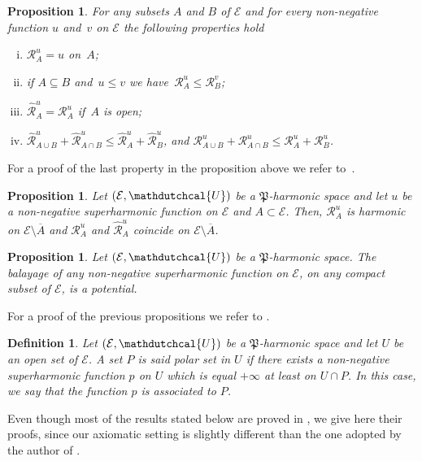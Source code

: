 \documentclass{amsart}
\newtheorem{prop}[thm]{Proposition}
\newtheorem{defn}[thm]{Definition}
\numberwithin{equation}{section}
\def \Ec{{\mathcal{E}}}
\def \Ud{{\mathdutchcal{U}}}
\def \reduit{{\mathcal{R}}}
\def \balayage{{\widehat{\mathcal{R}}}}
\begin{document}
{\begin{prop}\label{subadd of balayage}
For any subsets $A$ and $B$ of $\Ec$ and for every non-negative function $u$ and~$v$ on $\Ec$ the following properties hold
	\begin{enumerate}[(i)]
\item $\reduit^u_A =u$ on~$A$;
\item if $A \subseteq B$ and~$u \leq v$ we have~$\reduit^u_A \leq \reduit^v_B$;
\item $\balayage^u_A = \reduit^u_A$ if~$A$ is open;
\item $\balayage^u_{A \cup B} +\balayage^u_{A \cap B} \leq \balayage^u_{A} + \balayage^u_{B}$, and $ \reduit^u_{A \cup B}+ \reduit^u_{A \cap B} \leq \reduit^u_{A}+\reduit^u_{B}$.
\end{enumerate}
\end{prop}
 For a proof of the last property in the proposition above we refer to~\cite[Theorem~4.2.2]{CC72}.

\begin{prop}%
Let $(\Ec,\Ud)$ be a $\mathfrak{P}$-harmonic space and let $u$ be a non-negative superharmonic function on $\Ec$ and  $A\subset \Ec$. Then, $\reduit^u_A$ is harmonic on $\Ec \setminus \overline{A}$ and $\reduit^u_A$ and $\balayage^u_A$ coincide on $\Ec \setminus \overline{A}$.
\end{prop}

\begin{prop}%
Let $(\Ec,\Ud)$ be a $\mathfrak{P}$-harmonic space. The balayage of any non-negative superharmonic function on $\Ec$, on any compact subset of $\Ec$, is a potential.
\end{prop}

For a proof of the previous propositions we refer to \cite[Proposition 5.3.1 and Proposition 5.3.5]{CC72}.
  
\begin{defn}\label{polar}
	Let $(\Ec,\Ud)$ be a $\mathfrak{P}$-harmonic space and let $U$ be an open set of $\Ec$. A set $P$ is said \textup{polar set} in $U$ if there exists a non-negative superharmonic function $p$ on $U$ which is equal $+\infty$ at least on $U \cap P$. In this case, we say that the function $p$ is \textup{associated to} $P$.	
\end{defn}
Even though most of the results stated below are proved in \cite{Bre60}, we give here their proofs, since our axiomatic setting is slightly different than the one adopted by the author of \cite{Bre60}.

}
\end{document}
